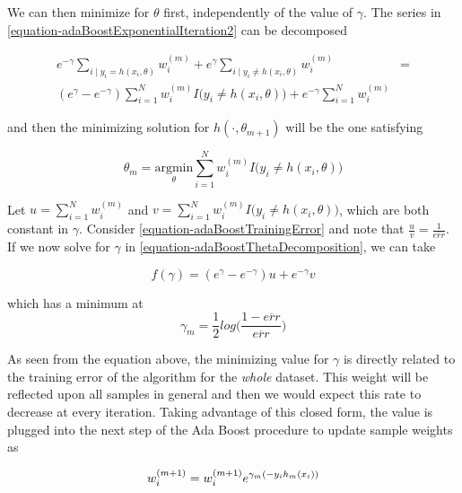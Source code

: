 We can then minimize for $\theta$ first, independently of the value of $\gamma$. The series in \cref{equation-adaBoostExponentialIteration2} can be decomposed

\begin{equation} \label{equation-adaBoostThetaDecomposition}
\begin{split}
e^{-\gamma} \sum_{i \mid y_i = h(x_i,\theta)} w_i^{(m)} + e^{\gamma} \sum_{i \mid y_i \neq h(x_i,\theta)} w_i^{(m)} & = \\
( e^{\gamma} - e^{-\gamma}) \sum_{i = 1}^{N} w_i^{(m)} I \big( y_i \neq h(x_i,\theta)  \big) + e^{-\gamma} \sum_{i = 1}^{N}  w_i^{(m)} &
\end{split}
\end{equation}


and then the minimizing solution for $h(\cdot, \theta_{m+1})$ will be the one satisfying

\begin{equation} \label{equation-adaBoostThetaMinimization}
\theta_{m} = \underset{ \theta}{\mathrm{argmin}} \sum_{i=1}^{N} w_i^{(m)} I \big( y_i \neq h(x_i,\theta)  \big)
\end{equation}

Let $u = \sum_{i=1}^{N} w_i^{(m)}$ and $v = \sum_{i=1}^{N} w_i^{(m)} I \big( y_i \neq h(x_i,\theta)  \big) $, which are both constant in $\gamma$. Consider \cref{equation-adaBoostTrainingError} and note that $\frac{u}{v} = \frac{1}{\overline{err}}$. If we now solve for $\gamma$ in \cref{equation-adaBoostThetaDecomposition}, we can take

\begin{equation} \label{equation-adaBoostBetaMinimization}
f(\gamma) = ( e^{\gamma} - e^{-\gamma}) u + e^{-\gamma}v
\end{equation}

which has a minimum at
\begin{equation}
\gamma_{m} = \frac{1}{2} log\big( \frac{1 - \overline{err} }{ \overline{err} } \big)
\end{equation}

As seen from the equation above, the minimizing value for $\gamma$ is directly related to the training error of the algorithm for the \textit{whole} dataset. This weight will be reflected upon all samples in general and then we would expect this rate to decrease at every iteration. Taking advantage of this closed form, the value is plugged into the next step of the Ada Boost procedure to update sample weights as

\begin{equation}
w_i^{(m+1)} =  w_i^{(m+1)} e^{\gamma_m(-y_i h_m(x_i))} \\
\end{equation}


